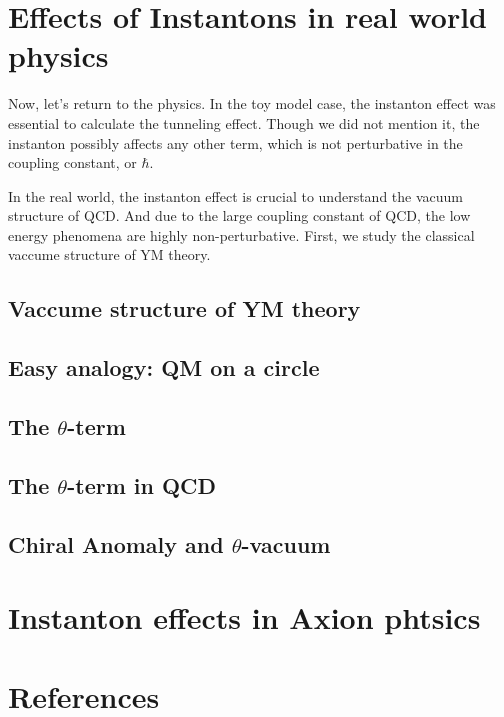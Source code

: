 \documentclass{article}
\begin{document}
\section{Effects of Instantons in real world physics}
Now, let's return to the physics. 
In the toy model case, the instanton effect was essential to calculate the tunneling effect. 
Though we did not mention it, the instanton possibly affects any other term, which is not perturbative in the coupling constant, or $\hbar$.

In the real world, the instanton effect is crucial to understand the vacuum structure of QCD.
And due to the large coupling constant of QCD, the low energy phenomena are highly non-perturbative.
First, we study the classical vaccume structure of YM theory.

\subsection{Vaccume structure of YM theory}


\subsection{Easy analogy: QM on a circle}


\subsection{The $\theta$-term}


\subsection{The $\theta$-term in QCD}


\subsection{Chiral Anomaly and $\theta$-vacuum}


\section{Instanton effects in Axion phtsics}

\section{References}
\end{document}
